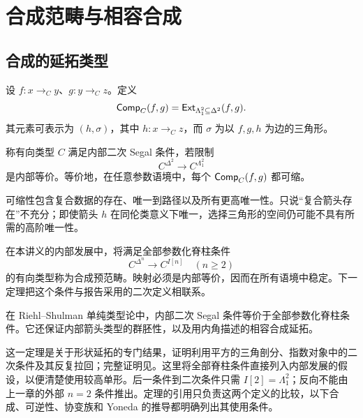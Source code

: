 \chapter{合成范畴与相容合成}
\section{合成的延拓类型}
\begin{definition}[二元合成数据]
设 $f:x\to_Cy$、$g:y\to_Cz$。定义
\[
\mathsf{Comp}_C(f,g)=\mathsf{Ext}_{\Lambda_1^2\subseteq\Delta^2}(f,g).
\]
其元素可表示为 $(h,\sigma)$，其中 $h:x\to_Cz$，而 $\sigma$ 为以 $f,g,h$ 为边的三角形。
\end{definition}
\begin{definition}
称有向类型 $C$ 满足内部二次 Segal 条件，若限制
\[
C^{\Delta^2}\longrightarrow C^{\Lambda_1^2}
\]
是内部等价。等价地，在任意参数语境中，每个 $\mathsf{Comp}_C(f,g)$ 都可缩。
\end{definition}
\begin{remark}
可缩性包含复合数据的存在、唯一到路径以及所有更高唯一性。只说“复合箭头存在”不充分；即使箭头 $h$ 在同伦类意义下唯一，选择三角形的空间仍可能不具有所需的高阶唯一性。
\end{remark}
\begin{definition}[合成预范畴]
在本讲义的内部发展中，将满足全部参数化脊柱条件
\[
C^{\Delta^n}\longrightarrow C^{I[n]}
\quad(n\ge2)
\]
的有向类型称为合成预范畴。映射必须是内部等价，因而在所有语境中稳定。下一定理把这个条件与报告采用的二次定义相联系。
\end{definition}
\begin{theorem}\label{thm:internal-segal}
在 Riehl--Shulman 单纯类型论中，内部二次 Segal 条件等价于全部参数化脊柱条件。它还保证内部箭头类型的群胚性，以及用内角描述的相容合成延拓。
\end{theorem}
\begin{remark}
这一定理是关于形状延拓的专门结果，证明利用平方的三角剖分、指数对象中的二次条件及其反复拉回；完整证明见\cite[第5节]{RiehlShulman}。这里将全部脊柱条件直接列入内部发展的假设，以便清楚使用较高单形。后一条件到二次条件只需 $I[2]=\Lambda_1^2$；反向不能由上一章的外部 $n=2$ 条件推出。定理的引用只负责这两个定义的比较，以下合成、可逆性、协变族和 Yoneda 的推导都明确列出其使用条件。
\end{remark}

